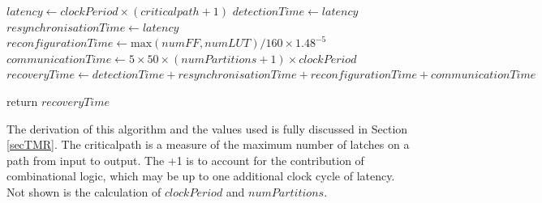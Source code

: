 \documentclass[12pt,final,oneside]{dwThesis} %
\begin{document}
\begin{algorithm}
      \begin{algorithmic}[1]
         \State
         $latency \gets clockPeriod\times{}(criticalpath+1)$ 
         \State
         $detectionTime \gets latency$ 
         \State $resynchronisationTime \gets
         latency$ 
         \State $reconfigurationTime \gets \mbox{max}(numFF,
         numLUT)/160\times 1.48^{-5}$ 
         \State $communicationTime \gets 5\times
         50\times(numPartitions+1)\times clockPeriod$ 
         \State $recoveryTime
         \gets
         detectionTime+resynchronisationTime+reconfigurationTime+communicationTime$

         \State return $recoveryTime$ \EndProcedure 
      \end{algorithmic}


   \end{algorithm}
   The derivation of this algorithm and the values used is
   fully discussed in Section \ref{secTMR}. The criticalpath is a measure of
   the maximum number of latches on a path from input to output. The +1 is to
   account for the contribution of combinational logic, which may be up to one
   additional clock cycle of latency.  Not shown is the calculation of
   $clockPeriod$ and $numPartitions$.



   \newpage 
\end{document}
